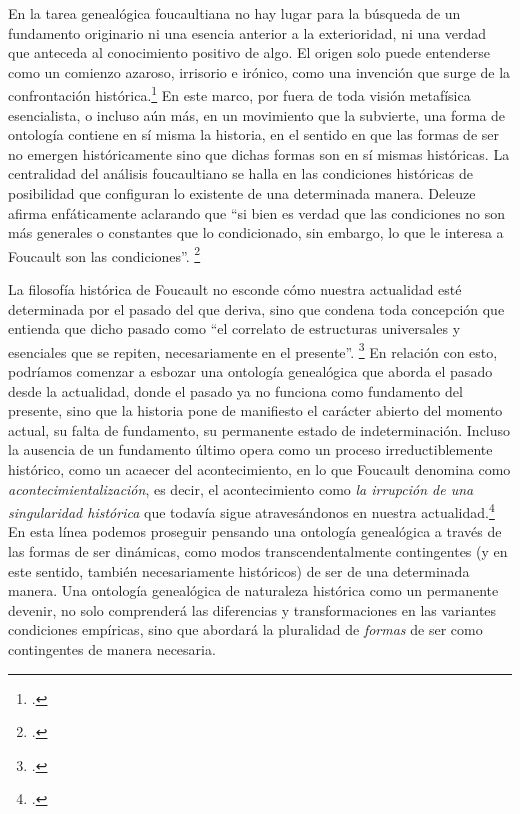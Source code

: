En la tarea genealógica foucaultiana no hay lugar para la búsqueda de un fundamento originario ni una esencia anterior a la exterioridad, ni una verdad que anteceda al conocimiento positivo de algo. El origen solo puede entenderse como un comienzo azaroso, irrisorio e irónico, como una invención que surge de la confrontación histórica.\footcite[][85-86]{@7046-DIAZ2005} En este marco, por fuera de toda visión metafísica esencialista, o incluso aún más, en un movimiento que la subvierte, una forma de ontología contiene en sí misma la historia, en el sentido en que las formas de ser no emergen históricamente sino que dichas formas son en sí mismas históricas. La centralidad del análisis foucaultiano se halla en las condiciones históricas de posibilidad que configuran lo existente de una determinada manera. Deleuze afirma enfáticamente aclarando que \enquote{si bien es verdad que las condiciones no son más generales o constantes que lo condicionado, sin embargo, lo que le interesa a Foucault son las condiciones}. \footcite[][151]{@7053-DELEUZE2008}

La filosofía histórica de Foucault no esconde cómo nuestra actualidad esté determinada por el pasado del que deriva, sino que condena toda concepción que entienda que dicho pasado como \enquote{el correlato de estructuras universales y esenciales que se repiten, necesariamente en el presente}. \footcite[][85]{@7058-MOROABADIA2006} En relación con esto, podríamos comenzar a esbozar una ontología genealógica que aborda el pasado desde la actualidad, donde el pasado ya no funciona como fundamento del presente, sino que la historia pone de manifiesto el carácter abierto del momento actual, su falta de fundamento, su permanente estado de indeterminación. Incluso la ausencia de un fundamento último opera como un proceso irreductiblemente histórico, como un acaecer del acontecimiento, en lo que Foucault denomina como \emph{acontecimientalización}, es decir, el acontecimiento como \emph{la irrupción de una singularidad histórica} que todavía sigue atravesándonos en nuestra actualidad.\footcite[Véase][9-11]{@7041-REVEL2008} En esta línea podemos proseguir pensando una ontología genealógica a través de las formas de ser dinámicas, como modos transcendentalmente contingentes (y en este sentido, también necesariamente históricos) de ser de una determinada manera. Una ontología genealógica de naturaleza histórica como un permanente devenir, no solo comprenderá las diferencias y transformaciones en las variantes condiciones empíricas, sino que abordará la pluralidad de \emph{formas} de ser como contingentes de manera necesaria.

